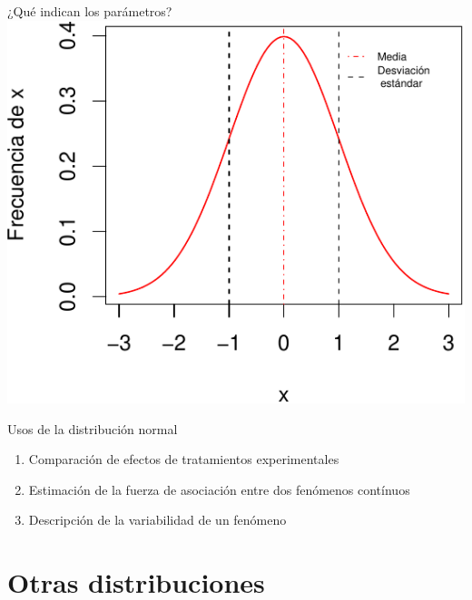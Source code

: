 \documentclass[
  11pt,
  ignorenonframetext,
]{beamer}
\providecommand{\tightlist}{%
  \setlength{\itemsep}{0pt}\setlength{\parskip}{0pt}}
\begin{document}
\begin{frame}{¿Qué indican los parámetros?}
\protect\hypertarget{quuxe9-indican-los-paruxe1metros}{}
\includegraphics{Distribuciones_files/figure-beamer/unnamed-chunk-2-1.pdf}
\end{frame}

\begin{frame}{Usos de la distribución normal}
\protect\hypertarget{usos-de-la-distribuciuxf3n-normal}{}
\begin{enumerate}
\tightlist
\item
  Comparación de efectos de tratamientos experimentales
\item
  Estimación de la fuerza de asociación entre dos fenómenos contínuos
\item
  Descripción de la variabilidad de un fenómeno
\end{enumerate}
\end{frame}

\hypertarget{otras-distribuciones}{%
\section{Otras distribuciones}\label{otras-distribuciones}}
\end{document}
